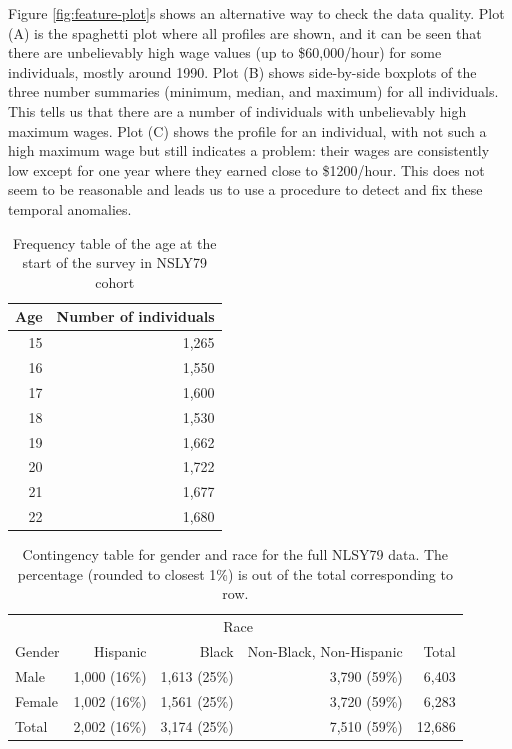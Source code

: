 \documentclass[12pt]{article}
\begin{document}
Figure \ref{fig:feature-plot}s shows an alternative way to check the data quality. Plot (A) is the spaghetti plot where all profiles are shown, and it can be seen that there are unbelievably high wage values (up to \$60,000/hour) for some individuals, mostly around 1990. Plot (B) shows side-by-side boxplots of the three number summaries (minimum, median, and maximum) for all individuals. This tells us that there are a number of individuals with unbelievably high maximum wages. Plot (C) shows the profile for an individual, with not such a high maximum wage but still indicates a problem: their wages are consistently low except for one year where they earned close to \$1200/hour. This does not seem to be reasonable and leads us to use a procedure to detect and fix these temporal anomalies.

\begin{table}

\caption{\label{tab:age-table}Frequency table of the age at the start of the survey in NSLY79 cohort}
\centering
\begin{tabular}[t]{rr}
\toprule
Age & Number of individuals\\
\midrule
15 & 1,265\\
16 & 1,550\\
17 & 1,600\\
18 & 1,530\\
19 & 1,662\\
20 & 1,722\\
21 & 1,677\\
22 & 1,680\\
\bottomrule
\end{tabular}
\end{table}

\begin{table}

\caption{\label{tab:gender-race-table}Contingency table for gender and race for the full NLSY79 data. The percentage (rounded to closest 1\%) is out of the total corresponding to row.}
\centering
\begin{tabular}[t]{lrrrr}
\toprule
\multicolumn{1}{c}{ } & \multicolumn{3}{c}{Race} & \multicolumn{1}{c}{ } \\
\cmidrule(l{3pt}r{3pt}){2-4}
Gender & Hispanic & Black & Non-Black, Non-Hispanic & Total\\
\midrule
Male & 1,000 (16\%) & 1,613 (25\%) & 3,790 (59\%) & 6,403\\
Female & 1,002 (16\%) & 1,561 (25\%) & 3,720 (59\%) & 6,283\\
\midrule
Total & 2,002 (16\%) & 3,174 (25\%) & 7,510 (59\%) & 12,686\\
\bottomrule
\end{tabular}
\end{table}
\end{document}
